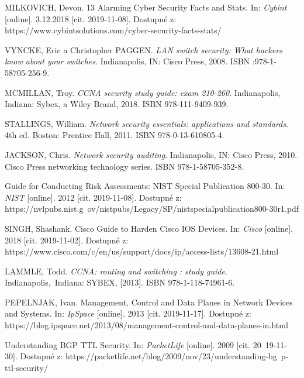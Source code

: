 

\begin{literatura}{99}
MILKOVICH, Devon. 13 Alarming Cyber Security Facts and Stats. In: \textit{Cybint} [online]. 3.12.2018 [cit. 2019-11-08]. Dostupné z: https://www.cybintsolutions.com/cyber-security-facts-stats/

VYNCKE, Eric a Christopher PAGGEN. \textit{LAN switch security: What hackers know about your switches}. Indianapolis, IN: Cisco Press, 2008. ISBN :978-1-58705-256-9.	
	
MCMILLAN, Troy. \textit{CCNA security study guide: exam 210-260}. Indianapolis, Indiana: Sybex, a Wiley Brand, 2018. ISBN 978-111-9409-939.
	
STALLINGS, William. \textit{Network security essentials: applications and standards}. 4th ed. Boston: Prentice Hall, 2011. ISBN 978-0-13-610805-4.

JACKSON, Chris. \textit{Network security auditing}. Indianapolis, IN: Cisco Press, 2010. Cisco Press networking technology series. ISBN 978-1-58705-352-8.

Guide for Conducting Risk Assessments: NIST Special Publication 800-30. In: \textit{NIST} [online]. 2012 [cit. 2019-11-08]. Dostupné z: https://nvlpubs.nist.g\
ov/nistpubs/Legacy/SP/nistspecialpublication800-30r1.pdf

SINGH, Shashank. Cisco Guide to Harden Cisco IOS Devices. In: \textit{Cisco} [online]. 2018 [cit. 2019-11-02]. Dostupné z: https://www.cisco.com/c/en/us/support/docs/ip/access-lists/13608-21.html	

LAMMLE, Todd. \textit{CCNA: routing and switching : study guide}. Indianapolis,\
Indiana: SYBEX, [2013]. ISBN 978-1-118-74961-6.
	
PEPELNJAK, Ivan. Management, Control and Data Planes in Network Devices and Systems. In: \textit{IpSpace} [online]. 2013 [cit. 2019-11-17]. Dostupné z: https://blog.ipspace.net/2013/08/management-control-and-data-planes-in.html

\bibitem{AlHFaPbj6IbKzbuv}
Understanding BGP TTL Security. In: \textit{PacketLife} [online]. 2009 [cit. 20\
19-11-30]. Dostupné z: https://packetlife.net/blog/2009/nov/23/understanding-bg\
p-ttl-security/


\end{literatura}
